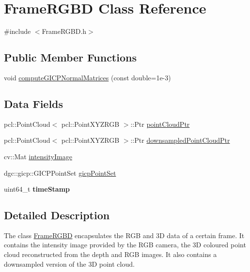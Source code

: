 \hypertarget{class_frame_r_g_b_d}{
\section{FrameRGBD Class Reference}
\label{class_frame_r_g_b_d}
}


{\ttfamily \#include $<$FrameRGBD.h$>$}

\subsection*{Public Member Functions}
\begin{DoxyCompactItemize}
\item 
void \hyperlink{class_frame_r_g_b_d_ac3f882e82c847c18e817c988f1f47e6f}{computeGICPNormalMatrices} (const double=1e-\/3)
\end{DoxyCompactItemize}
\subsection*{Data Fields}
\begin{DoxyCompactItemize}
\item 
pcl::PointCloud$<$ pcl::PointXYZRGB $>$::Ptr \hyperlink{class_frame_r_g_b_d_a03899f04e6597201e13fb2e046fd0983}{pointCloudPtr}
\item 
pcl::PointCloud$<$ pcl::PointXYZRGB $>$::Ptr \hyperlink{class_frame_r_g_b_d_a7c5a9dcf60d9ee1ac6d4d707257e965f}{downsampledPointCloudPtr}
\item 
cv::Mat \hyperlink{class_frame_r_g_b_d_a198aed26e98378616a1aee67f1e32182}{intensityImage}
\item 
dgc::gicp::GICPPointSet \hyperlink{class_frame_r_g_b_d_aeadd4cb8c9658d6b995ce72d9bef200d}{gicpPointSet}
\item 
\hypertarget{class_frame_r_g_b_d_a76abacf5326b11709d9f90a9dcd09817}{
uint64\_\-t {\bfseries timeStamp}}
\label{class_frame_r_g_b_d_a76abacf5326b11709d9f90a9dcd09817}

\end{DoxyCompactItemize}


\subsection{Detailed Description}
The class \hyperlink{class_frame_r_g_b_d}{FrameRGBD} encapsulates the RGB and 3D data of a certain frame. It contains the intensity image provided by the RGB camera, the 3D coloured point cloud reconstructed from the depth and RGB images. It also contains a downsampled version of the 3D point cloud. 

